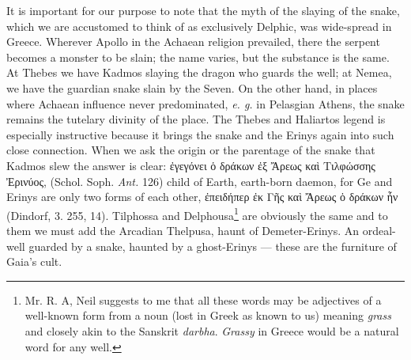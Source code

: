 \documentclass[a4paper, 11pt, oneside, polutonikogreek, english]{article}
\begin{document}
It is important for our purpose to note that the myth of the slaying of the snake, which we are accustomed to think of as exclusively Delphic, was wide-spread in Greece. Wherever Apollo in the Achaean religion prevailed, there the serpent becomes a monster to be slain; the name varies, but the substance is the same. At Thebes we have Kadmos slaying the dragon who guards the well; at Nemea, we have the guardian snake slain by the Seven. On the other hand, in places where Achaean influence never predominated, \emph{e. g.} in Pelasgian Athens, the snake remains the tutelary divinity of the place. The Thebes and Haliartos legend is especially instructive because it brings the snake and the Erinys again into such close connection. When we ask the origin or the parentage of the snake that Kadmos slew the answer is clear: ἐγεγόνει ὁ δράκων ἐξ Ἄρεως καὶ Τιλφώσσης Ἐρινύος, (Schol. Soph. \emph{Ant.} 126) child of Earth, earth-born daemon, for Ge and Erinys are only two forms of each other, ἐπειδήπερ ἐκ Γῆς καὶ Ἄρεως ὁ δράκων ἦν (Dindorf, 3. 255, 14). Tilphossa and Delphousa\footnote{Mr. R. A, Neil suggests to me that all these words may be adjectives of a well-known form from a noun (lost in Greek as known to us) meaning \emph{grass} and closely akin to the Sanskrit \emph{darbha}. \emph{Grassy} in Greece would be a natural word for any well.} are obviously the same and to them we must add the Arcadian Thelpusa, haunt of Demeter-Erinys. An ordeal-well guarded by a snake, haunted by a ghost-Erinys --- these are the furniture of Gaia's cult.
\end{document}
